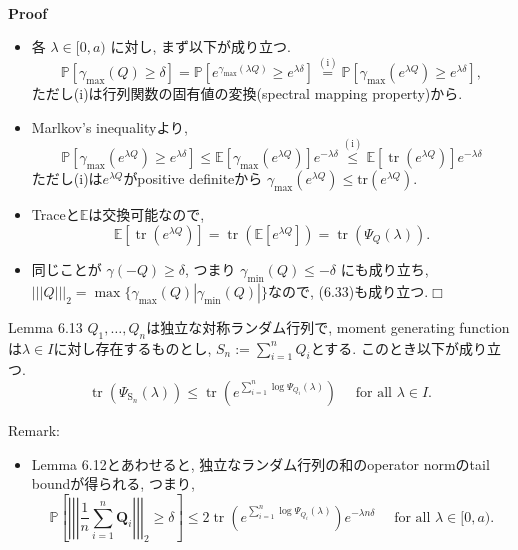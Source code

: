 \documentclass[unicode,aspectratio=169,11pt]{beamer}
\def\qed{\hfill $\Box$}
\newcommand{\ex}{\mathbb{E}}
\newcommand{\trace}{\mathrm{tr}}
\begin{document}
\begin{frame}{}{}
  　\\
{\bf Proof}
\begin{itemize}
  \item 各 $\lambda \in [0, a)$ に対し, まず以下が成り立つ.
        \[
          \mathbb{P}\left[\gamma_{\max }( {Q}) \geq \delta\right]
          =\mathbb{P}\left[e^{\gamma_{\max }(\lambda  {Q})} \geq e^{\lambda \delta}\right]
          \stackrel{(\mathrm{i})}{=} \mathbb{P}\left[\gamma_{\max }\left(e^{\lambda  {Q}}\right) \geq e^{\lambda \delta}\right],
          \tag{6.34}
        \]
        ただし(i)は行列関数の固有値の変換(spectral mapping property)から.
  \item Marlkov's inequalityより,
        \[
          \mathbb{P}\left[\gamma_{\max }\left(e^{\lambda  {Q}}\right) \geq e^{\lambda \delta}\right]
          \leq \mathbb{E}\left[\gamma_{\max }\left(e^{\lambda  {Q}}\right)\right] e^{-\lambda \delta}
          \stackrel{\mathrm{(i)}}{\leq} \mathbb{E}\left[\operatorname{tr}\left(e^{\lambda  {Q}}\right)\right] e^{-\lambda \delta}
          \tag{6.35}
        \]
        ただし(i)は$e^{\lambda Q}$がpositive definiteから $\gamma_{\max} (e^{\lambda Q}) \le \trace(e^{\lambda Q})$.
  \item Traceと$\ex$は交換可能なので,
        \[
          \mathbb{E}\left[\operatorname{tr}\left(e^{\lambda  {Q}}\right)\right]
          =\operatorname{tr}\left(\mathbb{E}\left[e^{\lambda  {Q}}\right]\right)
          =\operatorname{tr}\left(\Psi_{ {Q}}(\lambda)\right).
        \]
  \item 同じことが $\gamma(-Q) \ge \delta$, つまり $\gamma_{\min}(Q) \le -\delta$ にも成り立ち,
        $|||Q|||_2 = \max\{\gamma_{\max}(Q) |\gamma_{\min}(Q)|\}$なので, (6.33)も成り立つ.\qed
\end{itemize}
\end{frame}

\begin{frame}{}{}
  \begin{block}{Lemma 6.13}
    $Q_1,\dots,Q_n$は独立な対称ランダム行列で, moment generating functionは$\lambda \in I$に対し存在するものとし,
    $S_n := \sum_{i=1}^n Q_i$とする.
    このとき以下が成り立つ.
    \[
      \operatorname{tr}\left(\Psi_{\mathrm{S}_{n}}(\lambda)\right)
      \leq \operatorname{tr}\left(e^{\sum_{i=1}^{n} \log \Psi_{Q_i}(\lambda)}\right) \quad \text { for all } \lambda \in I.
      \tag{6.36}
    \]
  \end{block}
  {Remark:}
  \begin{itemize}
    \item Lemma 6.12とあわせると, 独立なランダム行列の和のoperator normのtail boundが得られる, つまり, 
          \[
            \mathbb{P}\left[\left|\left|\left|\frac{1}{n} \sum_{i=1}^{n} \mathbf{Q}_{i}\right|\right|\right|_{2} \geq \delta\right]
            \leq 2 \operatorname{tr}\left(e^{\sum_{i=1}^{n} \log \Psi_{Q_i}(\lambda)}\right) e^{-\lambda n \delta}
            \quad \text { for all } \lambda \in[0, a).
          \]
  \end{itemize}
\end{frame}
\end{document}
